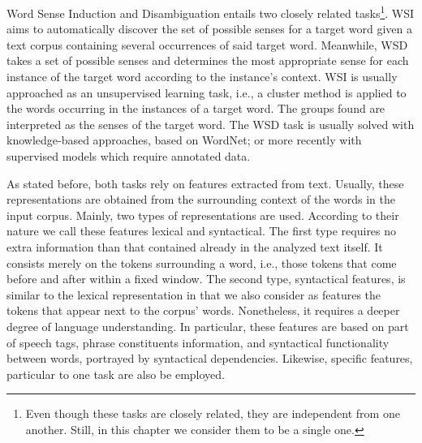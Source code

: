 Word Sense Induction and Disambiguation entails two closely related tasks\footnote{Even though these tasks are closely related, they are independent from one another. Still, in this chapter we consider them to be a single one.}. WSI aims to automatically discover the set of possible senses for a target word given a text corpus containing several occurrences of said target word. Meanwhile, WSD takes a set of possible senses and determines the most appropriate sense for each instance of the target word according to the instance's context. WSI is usually approached as an unsupervised learning task, i.e., a cluster method is applied to the words occurring in the instances of a target word. The groups found are interpreted as the senses of the target word. The WSD task is usually solved with knowledge-based approaches, based on WordNet; or more recently with supervised models which require annotated data.

As stated before, both tasks rely on features extracted from text. Usually, these representations are obtained from the surrounding context of the words in the  input corpus. Mainly,  two types of representations are used. According to their nature we call these features lexical and syntactical. 	The first type requires no extra information than that contained already in the analyzed text itself. It consists merely on the tokens surrounding a word, i.e., those tokens that come before and after within a fixed window. The second type, syntactical features, is similar to the lexical representation in that we also consider as features the tokens that appear next to the corpus' words. Nonetheless, it requires a deeper degree of language understanding. In particular, these features are based on part of speech tags, phrase constituents information, and syntactical functionality between words, portrayed by syntactical dependencies. Likewise, specific features, particular to one task are also be employed.



